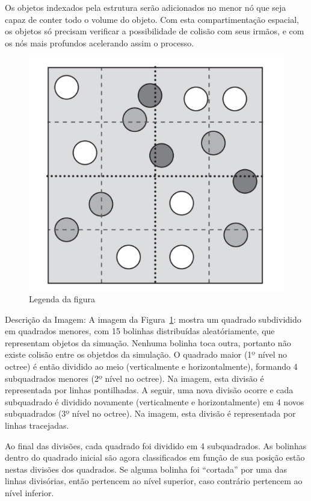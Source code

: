 Os objetos indexados pela estrutura serão adicionados no menor nó que seja capaz de conter todo o volume do objeto.
Com esta compartimentação espacial, os objetos só precisam verificar a possibilidade de colisão com seus irmãos, e com os nós mais profundos acelerando assim o processo.

\begin{figure}[htb]
  \centering
	\caption{\label{fig:figura1} Legenda da figura}
	\includegraphics[scale=0.5]{Imagens/Figura_7.11.png} %
\end{figure}

\noindent\footnotesize Descrição da Imagem: A imagem da Figura~\ref{fig:figura1}: mostra um quadrado subdividido em quadrados menores, com 15 bolinhas distribuídas aleatóriamente, que representam objetos da simuação. Nenhuma bolinha toca outra, portanto não existe colisão entre os objetdos da simulação. O quadrado maior (1º nível no octree) é então dividido ao meio (verticalmente e horizontalmente), formando 4 subquadrados menores (2º nível no octree). Na imagem, esta divisão é representada por linhas pontilhadas. A seguir, uma nova divisão ocorre e cada subquadrado é dividido novamente (verticalmente e horizontalmente) em 4 novos subquadrados (3º nível no octree). Na imagem, esta divisão é representada por linhas tracejadas. 

\noindent\footnotesize Ao final das divisões, cada quadrado foi dividido em 4 subquadrados. As bolinhas dentro do quadrado inicial são agora classificados em função de sua posição estão nestas divisões dos quadrados. Se alguma bolinha foi “cortada” por uma das linhas divisórias, então pertencem ao nível superior, caso contrário pertencem ao nível inferior.

